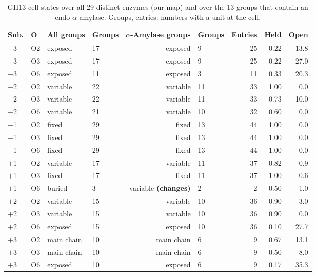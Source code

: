 \documentclass[preprint,12pt]{elsarticle}
\begin{document}
\begin{table}[h]
\centering\scriptsize\setlength{\tabcolsep}{3pt}
\caption{GH13 cell states over all 29 distinct enzymes (our map) and over the 13 groups that contain an endo-$\alpha$-amylase. Groups, entries: numbers with a unit at the cell.}
\label{tab:alpha}
\begin{tabular}{llllrlrrr}
\toprule
Sub. & O & All groups & Groups & $\alpha$-Amylase groups & Groups & Entries & Held & Open\\
\midrule
$-$3 & O2 & exposed & 17 & exposed & 9 & 25 & 0.22 & 13.8\\
$-$3 & O3 & exposed & 17 & exposed & 9 & 25 & 0.22 & 27.0\\
$-$3 & O6 & exposed & 11 & exposed & 3 & 11 & 0.33 & 20.3\\
$-$2 & O2 & variable & 22 & variable & 11 & 33 & 1.00 & 0.0\\
$-$2 & O3 & variable & 22 & variable & 11 & 33 & 0.73 & 10.0\\
$-$2 & O6 & variable & 21 & variable & 10 & 32 & 0.60 & 0.0\\
$-$1 & O2 & fixed & 29 & fixed & 13 & 44 & 1.00 & 0.0\\
$-$1 & O3 & fixed & 29 & fixed & 13 & 44 & 1.00 & 0.0\\
$-$1 & O6 & fixed & 29 & fixed & 13 & 44 & 1.00 & 0.0\\
$+$1 & O2 & variable & 17 & variable & 11 & 37 & 0.82 & 0.9\\
$+$1 & O3 & fixed & 17 & fixed & 11 & 37 & 1.00 & 0.6\\
$+$1 & O6 & buried & 3 & variable \textbf{(changes)} & 2 & 2 & 0.50 & 1.0\\
$+$2 & O2 & variable & 15 & variable & 10 & 36 & 0.90 & 3.0\\
$+$2 & O3 & variable & 15 & variable & 10 & 36 & 0.90 & 0.0\\
$+$2 & O6 & exposed & 15 & exposed & 10 & 36 & 0.10 & 27.7\\
$+$3 & O2 & main chain & 10 & main chain & 6 & 9 & 0.67 & 13.1\\
$+$3 & O3 & main chain & 10 & main chain & 6 & 9 & 0.50 & 8.0\\
$+$3 & O6 & exposed & 10 & exposed & 6 & 9 & 0.17 & 35.3\\
\bottomrule
\end{tabular}
\end{table}
\end{document}
